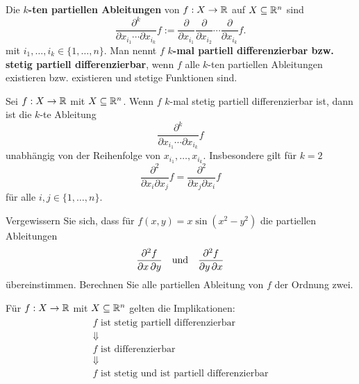 \begin{defn} 
	Die  \textbf{$k$-ten partiellen Ableitungen} von $f : X \to \mathbb{R}$ auf $X \subseteq \mathbb{R}^n$ sind 
	\[
		\frac{\partial^k}{\partial x_{i_1} \cdots \partial x_{i_k}} f := \frac{\partial}{\partial x_{i_1}}\frac{\partial}{\partial x_{i_2}} \cdots \frac{\partial}{\partial x_{i_k}} f.
	\]
	mit $i_1,\ldots,i_k \in \{1,\ldots,n\}$. Man nennt $f$ \textbf{$k$-mal  partiell differenzierbar bzw. stetig partiell differenzierbar}, wenn $f$ alle $k$-ten partiellen Ableitungen existieren bzw. existieren und stetige Funktionen sind. 
\end{defn} 

\begin{thm}[Schwarz]
	Sei $f :  X \to \mathbb{R}$ mit $X \subseteq \mathbb{R}^n$. 
	Wenn $f$ $k$-mal stetig partiell differenzierbar ist, dann ist die $k$-te Ableitung 
	\[
		\frac{\partial^k}{\partial x_{i_1} \cdots \partial x_{i_k}} f
	\]
	unabhängig von der Reihenfolge von $x_{i_1},\ldots, x_{i_k}$. Insbesondere gilt für $k=2$
	\[
		\frac{\partial^2}{\partial x_i \partial x_j} f = \frac{\partial^2}{\partial x_j \partial x_i} f
	\]
	für alle $i,j \in \{1,\ldots,n\}$. 
\end{thm} 

\begin{aufg}
	Vergewissern Sie sich, dass für $f(x,y) = x \sin(x^2-y^2)$ die partiellen Ableitungen 
	\begin{align*}
	\frac{\partial^2 f}{\partial x \, \partial y} & & \text{und} & & \frac{\partial^2 f}{\partial y \, \partial x}
	\end{align*}
	übereinstimmen. Berechnen Sie alle partiellen Ableitung von $f$ der Ordnung zwei. 
\end{aufg} 


\begin{thm} 
	Für $f : X \to \mathbb{R}$ mit $X \subseteq \mathbb{R}^n$ gelten die Implikationen:
	\begin{align*}
		\begin{array}{c}
		 \text{$f$ ist stetig partiell differenzierbar}
		\\ \Downarrow
		\\ \text{$f$ ist differenzierbar} 
		\\ \Downarrow 
		\\ \text{$f$ ist stetig und ist partiell differenzierbar}
		\end{array}
	\end{align*} 
\end{thm} 

